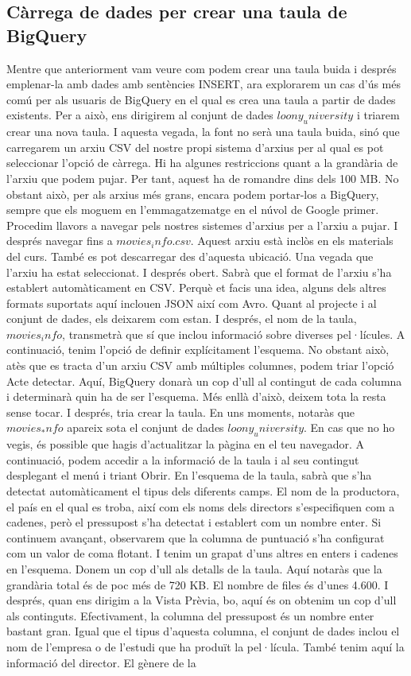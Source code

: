 \documentclass[12pt,longbibliography]{article}
\theoremstyle{definition}
\theoremstyle{remark}
\begin{document}
\subsection{Càrrega de dades per crear una taula de BigQuery}

Mentre que anteriorment vam veure com podem crear una taula buida i després emplenar-la amb dades amb sentències INSERT, ara explorarem un cas d'ús més comú per als usuaris de BigQuery en el qual es crea una taula a partir de dades existents. Per a això, ens dirigirem al conjunt de dades $loony_university$ i triarem crear una nova taula. I aquesta vegada, la font no serà una taula buida, sinó que carregarem un arxiu CSV del nostre propi sistema d'arxius per al qual es pot seleccionar l'opció de càrrega. Hi ha algunes restriccions quant a la grandària de l'arxiu que podem pujar. Per tant, aquest ha de romandre dins dels 100 MB. No obstant això, per als arxius més grans, encara podem portar-los a BigQuery, sempre que els moguem en l'emmagatzematge en el núvol de Google primer. Procedim llavors a navegar pels nostres sistemes d'arxius per a l'arxiu a pujar. I després navegar fins a $movies_info.csv$. Aquest arxiu està inclòs en els materials del curs. També es pot descarregar des d'aquesta ubicació. Una vegada que l'arxiu ha estat seleccionat. I després obert. Sabrà que el format de l'arxiu s'ha establert automàticament en CSV. Perquè et facis una idea, alguns dels altres formats suportats aquí inclouen JSON així com Avro. Quant al projecte i al conjunt de dades, els deixarem com estan. I després, el nom de la taula, $movies_info$, transmetrà que sí que inclou informació sobre diverses pel·lícules. A continuació, tenim l'opció de definir explícitament l'esquema. No obstant això, atès que es tracta d'un arxiu CSV amb múltiples columnes, podem triar l'opció Acte detectar. Aquí, BigQuery donarà un cop d'ull al contingut de cada columna i determinarà quin ha de ser l'esquema. Més enllà d'això, deixem tota la resta sense tocar. I després, tria crear la taula. En uns moments, notaràs que $movies_*nfo$ apareix sota el conjunt de dades $loony_university$. En cas que no ho vegis, és possible que hagis d'actualitzar la pàgina en el teu navegador. A continuació, podem accedir a la informació de la taula i al seu contingut desplegant el menú i triant Obrir. En l'esquema de la taula, sabrà que s'ha detectat automàticament el tipus dels diferents camps. El nom de la productora, el país en el qual es troba, així com els noms dels directors s'especifiquen com a cadenes, però el pressupost s'ha detectat i establert com un nombre enter. Si continuem avançant, observarem que la columna de puntuació s'ha configurat com un valor de coma flotant. I tenim un grapat d'uns altres en enters i cadenes en l'esquema. Donem un cop d'ull als detalls de la taula. Aquí notaràs que la grandària total és de poc més de 720 KB. El nombre de files és d'unes 4.600. I després, quan ens dirigim a la Vista Prèvia, bo, aquí és on obtenim un cop d'ull als continguts. Efectivament, la columna del pressupost és un nombre enter bastant gran. Igual que el tipus d'aquesta columna, el conjunt de dades inclou el nom de l'empresa o de l'estudi que ha produït la pel·lícula. També tenim aquí la informació del director. El gènere de la 
\end{document}
